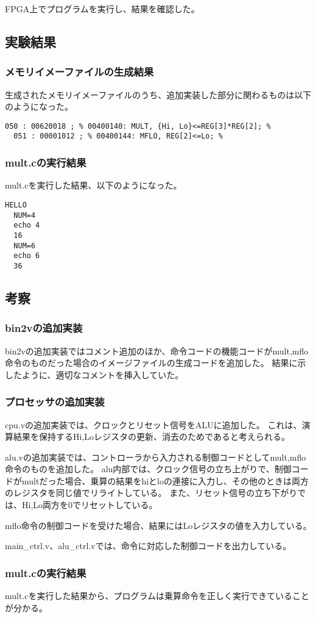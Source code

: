 FPGA上でプログラムを実行し、結果を確認した。

\subsection{実験結果}
\subsubsection{メモリイメーファイルの生成結果}
生成されたメモリイメーファイルのうち、追加実装した部分に関わるものは以下のようになった。
\begin{lstlisting}[caption={メモリイメーファイルの追加実装に関わる部分},label={メモリイメーファイルの追加実装に関わる部分}]
  050 : 00620018 ; % 00400140: MULT, {Hi, Lo}<=REG[3]*REG[2]; %
  051 : 00001012 ; % 00400144: MFLO, REG[2]<=Lo; %
\end{lstlisting}

\subsubsection{mult.cの実行結果}
mult.cを実行した結果、以下のようになった。
\begin{lstlisting}[caption={mult.cの実行結果},label={mult.cの実行結果}]
  HELLO
  NUM=4
  echo 4
  16
  NUM=6
  echo 6
  36
\end{lstlisting}

\subsection{考察}
\subsubsection{bin2vの追加実装}
bin2vの追加実装ではコメント追加のほか、命令コードの機能コードがmult,mflo命令のものだった場合のイメージファイルの生成コードを追加した。
結果に示したように、適切なコメントを挿入していた。

\subsubsection{プロセッサの追加実装}
cpu.vの追加実装では、クロックとリセット信号をALUに追加した。
これは、演算結果を保持するHi,Loレジスタの更新、消去のためであると考えられる。

alu.vの追加実装では、コントローラから入力される制御コードとしてmult,mflo命令のものを追加した。
alu内部では、クロック信号の立ち上がりで、制御コードがmultだった場合、乗算の結果をhiとloの連接に入力し、その他のときは両方のレジスタを同じ値でリライトしている。
また、リセット信号の立ち下がりでは、Hi,Lo両方を0でリセットしている。

mflo命令の制御コードを受けた場合、結果にはLoレジスタの値を入力している。

main\_ctrl.v、alu\_ctrl.vでは、命令に対応した制御コードを出力している。

\subsubsection{mult.cの実行結果}
mult.cを実行した結果から、プログラムは乗算命令を正しく実行できていることが分かる。
